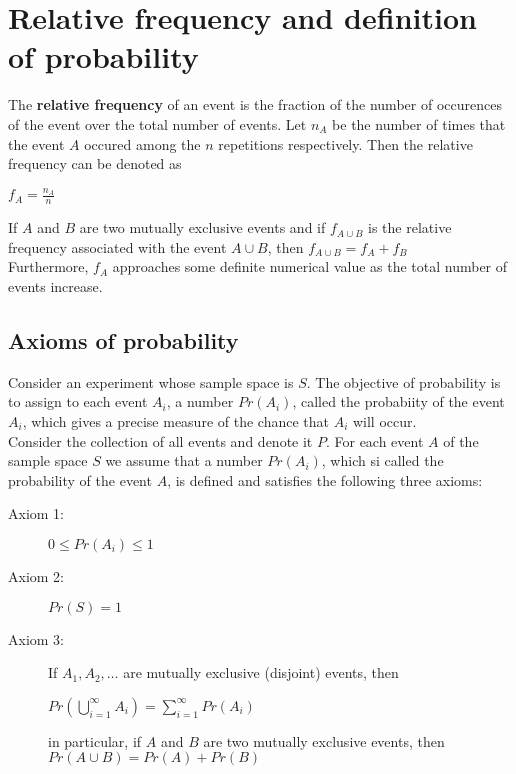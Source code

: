 \documentclass[a4paper]{article}
\begin{document}
\section{Relative frequency and definition of probability}
The \textbf{relative frequency} of an event is the fraction of the number of occurences of the event over the total number of events.
Let $n_A$ be the number of times that the event $A$ occured among the $n$ repetitions respectively.
Then the relative frequency can be denoted as
\begin{center}
	$f_A = \frac{n_A}{n}$
\end{center}
If $A$ and $B$ are two mutually exclusive events and if $f_{A\cup B}$ is the relative frequency associated with the event $A\cup B$, then $f_{A\cup B} = f_A + f_B$\\
Furthermore, $f_A$ approaches some definite numerical value as the total number of events increase.
\subsection{Axioms of probability}
Consider an experiment whose sample space is $S$. The objective of probability is to assign to each event $A_i$, a number $Pr(A_i)$, called the probabiity of the event $A_i$, which gives a precise measure of the chance that $A_i$ will occur.\\
Consider the collection of all events and denote it $P$. For each event $A$ of the sample space $S$ we assume that a number $Pr(A_i)$, which si called the probability of the event $A$, is defined and satisfies the following three axioms:
\begin{description}
	\item[Axiom 1:] $0 \le Pr(A_i) \le 1$
	\item[Axiom 2:] $Pr(S) = 1$
	\item[Axiom 3:] If $A_1,A_2,\dots$ are mutually exclusive (disjoint) events, then 
	\begin{center}
		$Pr(\bigcup\limits_{i=1}^{\infty}A_i) = \sum\limits_{i=1}^{\infty}Pr(A_i)$
	\end{center}
	in particular, if $A$ and $B$ are two mutually exclusive events, then $Pr(A\cup B) = Pr(A) + Pr(B)$
\end{description}
\end{document}

